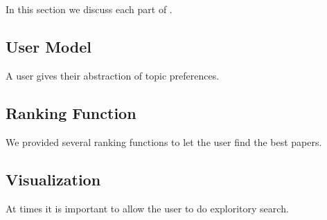 \section{\system}

In this section we discuss each part of \system.

\subsection{User Model}
A user gives their abstraction of topic preferences.


\subsection{Ranking Function}
We provided several ranking functions to let the user find
the best papers.



\subsection{Visualization}
At times it is important to allow the user to do exploritory search.



